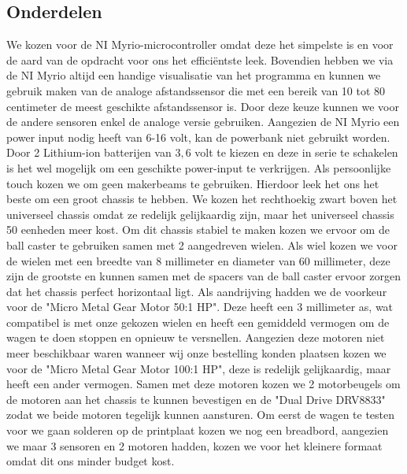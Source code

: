 \documentclass[a4paper,twoside,kulak]{kulakreport}
\begin{document}
	\subsection{Onderdelen}
		We kozen voor de NI Myrio-microcontroller omdat deze het simpelste is en voor de aard van de opdracht voor ons het efficiëntste leek. Bovendien hebben we via de NI Myrio altijd een handige visualisatie van het programma en kunnen we gebruik maken van de analoge afstandssensor die met een bereik van 10 tot 80 centimeter de meest geschikte afstandssensor is.
	Door deze keuze kunnen we voor de andere sensoren enkel de analoge versie gebruiken. Aangezien de NI Myrio een power input nodig heeft van 6-16 volt, kan de powerbank niet gebruikt worden. Door 2 Lithium-ion batterijen van $3,6$ volt te kiezen en deze in serie te schakelen is het wel mogelijk om een geschikte power-input te verkrijgen.
	Als persoonlijke touch kozen we om geen makerbeams te gebruiken. Hierdoor leek het ons het beste om een groot chassis te hebben. We kozen het rechthoekig zwart boven het universeel chassis omdat ze redelijk gelijkaardig zijn, maar het universeel chassis 50 eenheden meer kost. Om dit chassis stabiel te maken kozen we ervoor om de ball caster te gebruiken samen met 2 aangedreven wielen. Als wiel kozen we voor de wielen met een breedte van 8 millimeter en diameter van 60 millimeter, deze zijn de grootste en kunnen samen met de spacers van de ball caster ervoor zorgen dat het chassis perfect horizontaal ligt. Als aandrijving hadden we de voorkeur voor de "Micro Metal Gear Motor 50:1 HP". Deze heeft een 3 millimeter as, wat compatibel is met onze gekozen wielen en heeft een gemiddeld vermogen om de wagen te doen stoppen en opnieuw te versnellen. Aangezien deze motoren niet meer beschikbaar waren wanneer wij onze bestelling konden plaatsen kozen we voor de "Micro Metal Gear Motor 100:1 HP", deze is redelijk gelijkaardig, maar heeft een ander vermogen. Samen met deze motoren kozen we 2 motorbeugels om de motoren aan het chassis te kunnen bevestigen en de "Dual Drive DRV8833" zodat we beide motoren tegelijk kunnen aansturen.
	Om eerst de wagen te testen voor we gaan solderen op de printplaat kozen we nog een breadbord, aangezien we maar 3 sensoren en 2 motoren hadden, kozen we voor het kleinere formaat omdat dit ons minder budget kost. 
\end{document}
